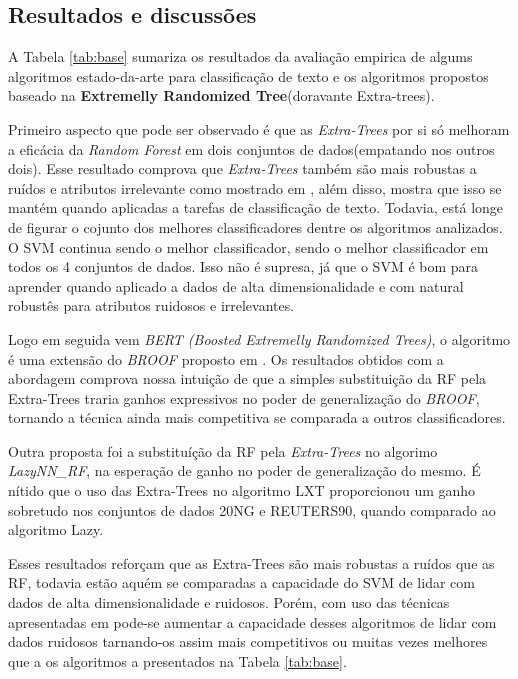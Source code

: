 \documentclass[]{book}
\begin{document}
\subsection{Resultados e discussões}\label{resultados-e-discussoes}

A Tabela \ref{tab:base} sumariza os resultados da avaliação empirica de
algums algoritmos estado-da-arte para classificação de texto e os
algoritmos propostos baseado na \textbf{Extremelly Randomized
Tree}(doravante Extra-trees).

Primeiro aspecto que pode ser observado é que as \emph{Extra-Trees} por
si só melhoram a eficácia da \emph{Random Forest} em dois conjuntos de
dados(empatando nos outros dois). Esse resultado comprova que
\emph{Extra-Trees} também são mais robustas a ruídos e atributos
irrelevante como mostrado em \citep{GEURTS2006}, além disso, mostra que
isso se mantém quando aplicadas a tarefas de classificação de texto.
Todavia, está longe de figurar o cojunto dos melhores classificadores
dentre os algoritmos analizados. O SVM continua sendo o melhor
classificador, sendo o melhor classificador em todos os 4 conjuntos de
dados. Isso não é supresa, já que o SVM é bom para aprender quando
aplicado a dados de alta dimensionalidade e com natural robustês para
atributos ruidosos e irrelevantes.

Logo em seguida vem \emph{BERT (Boosted Extremelly Randomized Trees)}, o
algoritmo é uma extensão do \emph{BROOF} proposto em
\citep{Salles:2015:BEO:2766462.2767747}. Os resultados obtidos com a
abordagem comprova nossa intuição de que a simples substituição da RF
pela Extra-Trees traria ganhos expressivos no poder de generalização do
\emph{BROOF}, tornando a técnica ainda mais competitiva se comparada a
outros classificadores.

Outra proposta foi a substituíção da RF pela \emph{Extra-Trees} no
algorimo \emph{LazyNN\_RF}, na esperação de ganho no poder de
generalização do mesmo. É nítido que o uso das Extra-Trees no algoritmo
LXT proporcionou um ganho sobretudo nos conjuntos de dados 20NG e
REUTERS90, quando comparado ao algoritmo Lazy.

Esses resultados reforçam que as Extra-Trees são mais robustas a ruídos
que as RF, todavia estão aquém se comparadas a capacidade do SVM de
lidar com dados de alta dimensionalidade e ruidosos. Porém, com uso das
técnicas apresentadas em \citep{Salles:Proposal:2015} pode-se aumentar a
capacidade desses algoritmos de lidar com dados ruidosos tarnando-os
assim mais competitivos ou muitas vezes melhores que a os algoritmos a
presentados na Tabela \ref{tab:base}.
\end{document}
